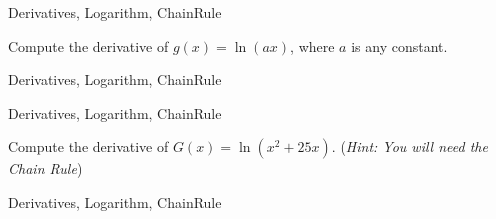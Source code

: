 
\begin{tagblock}{Derivatives, Logarithm, ChainRule}
\begin{question}

 Compute the derivative of $g(x) = \ln(ax)$, where $a$ is any constant.


	
\begin{tags}
	   Derivatives, Logarithm, ChainRule
\end{tags}
	
\begin{diary}
\end{diary}
	
\begin{solution}
	   
\end{solution}
	
\end{question}

\end{tagblock}


\begin{tagblock}{Derivatives, Logarithm, ChainRule}
\begin{question}

 Compute the derivative of $G(x) = \ln(x^2+25x)$.  (\emph{Hint:  You will need the Chain Rule})


	
\begin{tags}
	   Derivatives, Logarithm, ChainRule
\end{tags}
	
\begin{diary}
\end{diary}
	
\begin{solution}
	   
\end{solution}
	
\end{question}

\end{tagblock}


